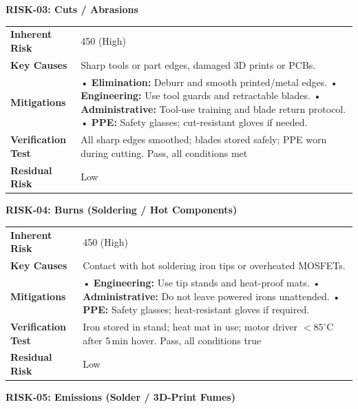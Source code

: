 \textbf{RISK-03: Cuts / Abrasions}

\begin{tabular}{@{}p{3cm}p{13cm}@{}}
\toprule
\textbf{Inherent Risk} & 450 (High) \\
\textbf{Key Causes} & Sharp tools or part edges, damaged 3D prints or PCBs. \\
\textbf{Mitigations} &
• \textbf{Elimination:} Deburr and smooth printed/metal edges. \newline
• \textbf{Engineering:} Use tool guards and retractable blades. \newline
• \textbf{Administrative:} Tool-use training and blade return protocol. \newline
• \textbf{PPE:} Safety glasses; cut-resistant gloves if needed. \\
\textbf{Verification Test} & All sharp edges smoothed; blades stored safely; PPE worn during cutting. Pass, all conditions met \\
\textbf{Residual Risk} & Low \\
\bottomrule
\end{tabular}
\vspace{0.6em}

\textbf{RISK-04: Burns (Soldering / Hot Components)}

\begin{tabular}{@{}p{3cm}p{13cm}@{}}
\toprule
\textbf{Inherent Risk} & 450 (High) \\
\textbf{Key Causes} & Contact with hot soldering iron tips or overheated MOSFETs. \\
\textbf{Mitigations} &
• \textbf{Engineering:} Use tip stands and heat-proof mats. \newline
• \textbf{Administrative:} Do not leave powered irons unattended. \newline
• \textbf{PPE:} Safety glasses; heat-resistant gloves if required. \\
\textbf{Verification Test} & Iron stored in stand; heat mat in use; motor driver $<85^\circ$C after 5\,min hover. Pass, all conditions true \\
\textbf{Residual Risk} & Low \\
\bottomrule
\end{tabular}
\vspace{0.6em}

\pagebreak
\textbf{RISK-05: Emissions (Solder / 3D-Print Fumes)}

